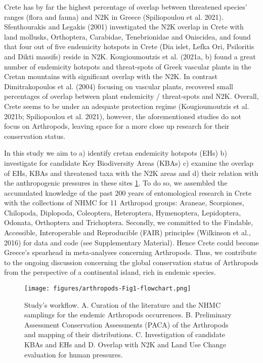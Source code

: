 Crete has by far the highest percentage of overlap between threatened species’
ranges (flora and fauna) and N2K in Greece (Spiliopoulou et al. 2021).
Sfenthourakis and Legakis (2001) investigated the N2K overlap in Crete with
land mollusks, Orthoptera, Carabidae, Tenebrionidae and Oniscidea, and found
that four out of five endemicity hotspots in Crete (Dia islet, Lefka Ori,
Psiloritis and Dikti massifs) reside in N2K. Kougioumoutzis et al. (2021a, b)
found a great number of endemicity hotspots and threat-spots of Greek vascular
plants in the Cretan mountains with significant overlap with the N2K.
In contrast Dimitrakopoulos et al. (2004) focusing on vascular plants,
recovered small percentages of overlap between plant endemicity / threat-spots and N2K.
Overall, Crete seems to be under an adequate protection regime (Kougioumoutzis et al. 2021b; Spiliopoulou et al. 2021),
however, the aforementioned studies do not focus on Arthropods, leaving space
for a more close up research for their conservation status.

In this study we aim to a) identify cretan endemicity hotspots (EHs)
b) investigate for candidate Key Biodiversity Areas (KBAs)
c) examine the overlap of EHs, KBAs and threatened taxa with the N2K areas and
d) their relation with the anthropogenic pressures in these sites \ref{fig:arthropods-fig1}.
To do so, we assembled the accumulated knowledge of the past 200 years of
entomological research in Crete with the collections of NHMC for 11 Arthropod groups:
Araneae, Scorpiones, Chilopoda, Diplopoda, Coleoptera, Heteroptera,
Hymenoptera, Lepidoptera, Odonata, Orthoptera and Trichoptera.
Secondly, we committed to the Findable, Accessible, Interoperable and Reproducible (FAIR) principles (Wilkinson et al., 2016)
for data and code (see Supplementary Material). Hence Crete could become Greece’s
spearhead in meta-analyses concerning Arthropods. Thus, we contribute to the
ongoing discussion concerning the global conservation status of Arthropods from
the perspective of a continental island, rich in endemic species.

   \begin{figure}[h]
      \centering
      \texttt{[image: figures/arthropods-Fig1-flowchart.png]}
      \caption[The study's workflow]{Study’s workflow. A. Curation of the literature and the NHMC samplings for the endemic Arthropods occurrences. B. Preliminary Assessment Conservation Assessments (PACA) of the Arthropods and mapping of their distributions. C. Investigation of candidate KBAs and EHs and D. Overlap with N2K and Land Use Change evaluation for human pressures.}
      \label{fig:arthropods-fig1}
   \end{figure}

